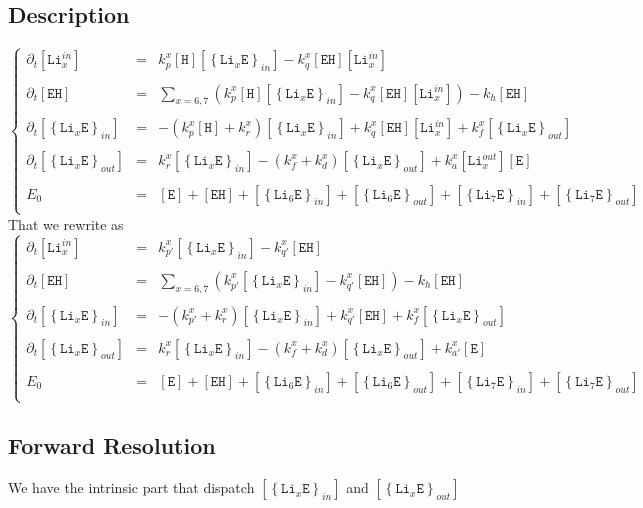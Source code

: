 \documentclass[aps,onecolumn,11pt]{revtex4}
\newcommand{\mychem}[1]{\mathtt{#1}}
\newcommand{\myconc}[1]{\left\lbrack{#1}\right\rbrack}
\newcommand{\LiEin}[1]{\myconc{\left\lbrace\mychem{Li}_{#1}\mychem{E}\right\rbrace_{in}}}
\newcommand{\LiEout}[1]{\myconc{\left\lbrace\mychem{Li}_{#1}\mychem{E}\right\rbrace_{out}}}
\newcommand{\LiIn}[1]{\myconc{\mychem{Li}_{#1}^{in}}}
\newcommand{\LiOut}[1]{\myconc{\mychem{Li}_{#1}^{out}}}
\newcommand{\EHin}{\myconc{\mychem{EH}}}
\newcommand{\Eout}{\myconc{\mychem{E}}}
\newcommand{\Hin}{\myconc{\mychem{H}}}
\begin{document}
\subsection{Description}
\begin{equation}
\displaystyle
\left\lbrace
\begin{array}{rcl}
\partial_t\LiIn{x}   & = & k_p^x \Hin \LiEin{x} - k_q^x \EHin \LiIn{x} \\
\\
\partial_t \EHin     & = & \displaystyle\sum_{x=6,7}\left( k_p^x \Hin \LiEin{x} - k_q^x \EHin \LiIn{x}\right) - k_h \EHin \\
\\
\partial_t \LiEin{x} & = & -\left(k_p^x \Hin + k_r^x\right) \LiEin{x} + k_q^x \EHin \LiIn{x}
+ k_f^x \LiEout{x} \\
\\
\partial_t \LiEout{x} & = & k_r^x \LiEin{x} - (k_f^x+k_d^x) \LiEout{x} + k_a^x \LiOut{x} \Eout \\
\\
E_0 & = & \Eout + \EHin + \LiEin{6} + \LiEout{6} + \LiEin{7}+\LiEout{7}\\
\end{array}
\right.
\end{equation}
That we rewrite as
\begin{equation}
\displaystyle
\left\lbrace
\begin{array}{rcl}
\partial_t\LiIn{x}   & = & k_{p'}^x \LiEin{x} - k_{q'}^x \EHin  \\
\\
\partial_t \EHin     & = & \displaystyle\sum_{x=6,7}\left( k_{p'}^x \LiEin{x} - k_{q'}^x \EHin \right) - k_h \EHin \\
\\
\partial_t \LiEin{x} & = & -\left(k_{p'}^x + k_r^x\right) \LiEin{x} + k_{q'}^x \EHin
+ k_f^x \LiEout{x} \\
\\
\partial_t \LiEout{x} & = & k_r^x \LiEin{x} - (k_f^x+k_d^x) \LiEout{x} + k_{a'}^x  \Eout \\
\\
E_0 & = & \Eout + \EHin + \LiEin{6} + \LiEout{6} + \LiEin{7}+\LiEout{7}\\
\end{array}
\right.
\end{equation}

\subsection{Forward Resolution}
We have the intrinsic part that dispatch $\LiEin{x}$ and $\LiEout{x}$
\end{document}
